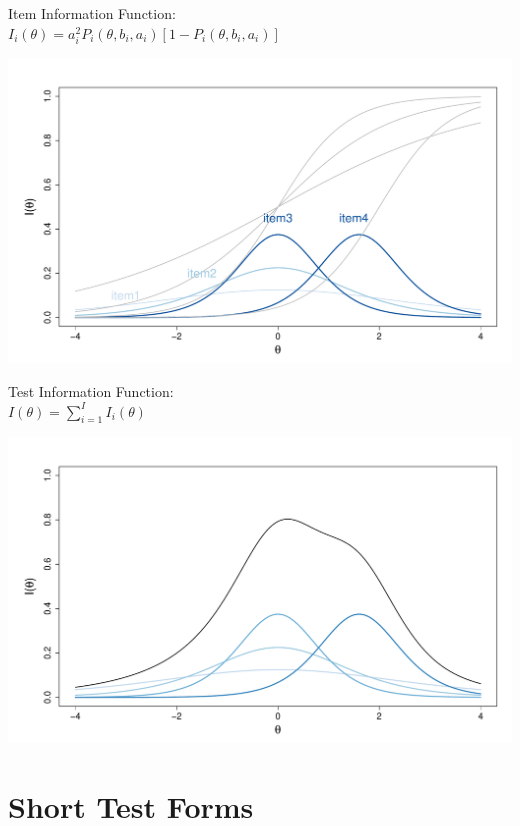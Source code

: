 \documentclass[aspectratio=149, compress]{beamer}
\begin{document}
\begin{frame}
	
	\centering
	\begin{overprint}
		
		\centering
		
		\vspace*{3mm}
		
		Item Information Function:	\\
		$I_i(\theta) = a_i^2P_i(\theta, b_i, a_i)[1-P_i(\theta, b_i, a_i)]$
		
		\centering
		\includegraphics[width=.80\linewidth]{img/IIF-2pl.pdf}
		
		\vspace*{3mm}
		Test Information Function:	\\	$I(\theta) =  \sum_{i = 1}^{I} I_i(\theta)$
		
		\centering
		\includegraphics[width=.80\linewidth]{img/TIF-2pl.pdf}
	\end{overprint}
\end{frame}

\section[STF]{Short Test Forms}
\end{document}
